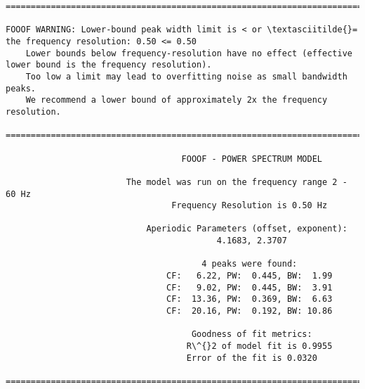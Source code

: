 \documentclass[11pt]{article}
\begin{document}
\begin{Verbatim}[commandchars=\\\{\}]
==================================================================================================

FOOOF WARNING: Lower-bound peak width limit is < or \textasciitilde{}= the frequency resolution: 0.50 <= 0.50
	Lower bounds below frequency-resolution have no effect (effective lower bound is the frequency resolution).
	Too low a limit may lead to overfitting noise as small bandwidth peaks.
	We recommend a lower bound of approximately 2x the frequency resolution.

==================================================================================================
                                                                                                  
                                   FOOOF - POWER SPECTRUM MODEL                                   
                                                                                                  
                        The model was run on the frequency range 2 - 60 Hz                        
                                 Frequency Resolution is 0.50 Hz                                  
                                                                                                  
                            Aperiodic Parameters (offset, exponent):                              
                                          4.1683, 2.3707                                          
                                                                                                  
                                       4 peaks were found:                                        
                                CF:   6.22, PW:  0.445, BW:  1.99                                 
                                CF:   9.02, PW:  0.445, BW:  3.91                                 
                                CF:  13.36, PW:  0.369, BW:  6.63                                 
                                CF:  20.16, PW:  0.192, BW: 10.86                                 
                                                                                                  
                                     Goodness of fit metrics:                                     
                                    R\^{}2 of model fit is 0.9955                                    
                                    Error of the fit is 0.0320                                    
                                                                                                  
==================================================================================================

    \end{Verbatim}
\end{document}
